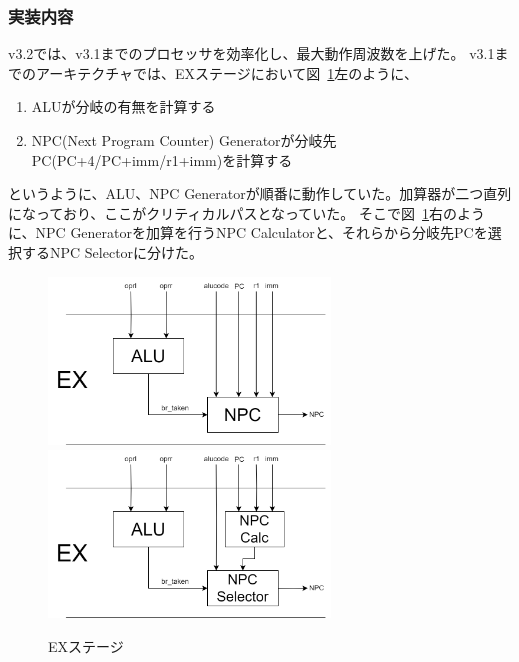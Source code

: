 \documentclass[dvipdfmx,10pt,a4paper,titlepage]{jsarticle}
\begin{document}
    \subsubsection{実装内容}
    v3.2では、v3.1までのプロセッサを効率化し、最大動作周波数を上げた。
    v3.1までのアーキテクチャでは、EXステージにおいて図~\ref{fig:NPC}左のように、
    \begin{enumerate}
        \item ALUが分岐の有無を計算する
        \item NPC(Next Program Counter) Generatorが分岐先PC(PC+4/PC+imm/r1+imm)を計算する
    \end{enumerate}
    というように、ALU、NPC Generatorが順番に動作していた。加算器が二つ直列になっており、ここがクリティカルパスとなっていた。
    そこで図~\ref{fig:NPC}右のように、NPC Generatorを加算を行うNPC Calculatorと、それらから分岐先PCを選択するNPC Selectorに分けた。
    \begin{figure}[h]
        \centering
        \includegraphics[width=7.5cm]{figure/NPC1.png}
        \includegraphics[width=7.5cm]{figure/NPC2.png}
        \caption{EXステージ}\label{fig:NPC}
    \end{figure}
\end{document}
